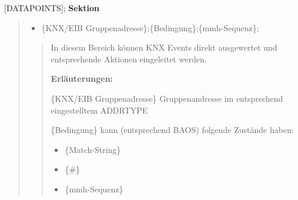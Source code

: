 \documentclass[letterpaper,10pt,english]{sphinxmanual}
\begin{document}
{[}DATAPOINTS{]}; \textbf{Sektion}
\begin{quote}
\begin{itemize}
\item {} 
\{KNX/EIB Gruppenadresse\};\{Bedingung\};\{mmh-Sequenz\};

\end{itemize}
\begin{quote}

\begin{DUlineblock}{0em}
\item[] In diesem Bereich können KNX Events direkt ausgewertet und entsprechende Aktionen eingeleitet werden.
\end{DUlineblock}

\begin{DUlineblock}{0em}
\item[] \textbf{Erläuterungen:}
\end{DUlineblock}

\begin{DUlineblock}{0em}
\item[] \{KNX/EIB Gruppenadresse\} Gruppenandresse im entsprechend eingestelltem ADDRTYPE
\item[] \{Bedingung\} kann (entsprechend BAOS) folgende Zustände haben:
\end{DUlineblock}
\begin{itemize}
\item {} \begin{description}
\item[{\{Match-String\}}] \leavevmode
{}

\end{description}

\item {} \begin{description}
\item[{\{\#\}}] \leavevmode
{}

\end{description}

\item {} \begin{description}
\item[{\{mmh-Sequenz\}}] \leavevmode
{}


\end{description}
\end{itemize}
\end{quote}
\end{quote}
\end{document}
